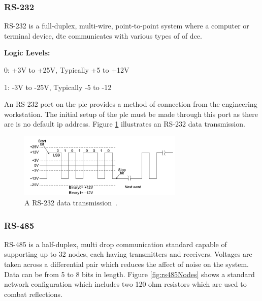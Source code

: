     \newpage
    \subsubsection{RS-232}
        RS-232 is a full-duplex, multi-wire, point-to-point system where a computer or terminal device, \acrfull{dte} communicates with various types of of \acrfull{dce}\cite{frenzel2015handbook}. 
        \begin{description}
            \item\textbf{Logic Levels:}
            \item0: +3V to +25V, Typically +5 to +12V
            \item1: -3V to -25V, Typically -5 to -12
        \end{description}
        
        An RS-232 port on the \acrshort{plc} provides a method of connection from the engineering workstation. The initial setup of the \acrshort{plc} must be made through this port as there are is no default \acrshort{ip} address.
        Figure \ref{fig:rs232Trans} illustrates an RS-232 data transmission.
        
        \begin{figure}[H]
            \centering
            \includegraphics[width = 0.7\textwidth]{2_images/rs232Trans.png}
            \caption{A RS-232 data transmission~\cite{frenzel2015handbook}.}
            \label{fig:rs232Trans}
        \end{figure} 
    \newpage    
    \subsubsection{RS-485}
       RS-485 is a half-duplex, multi drop communication standard capable of supporting up to 32 nodes, each having transmitters and receivers. Voltages are taken across a differential pair which reduces the affect of noise on the system.  Data can be from 5 to 8 bits in length. Figure \ref{fig:rs485Nodes} shows a standard network configuration which includes two 120 ohm resistors which are used to combat reflections.

